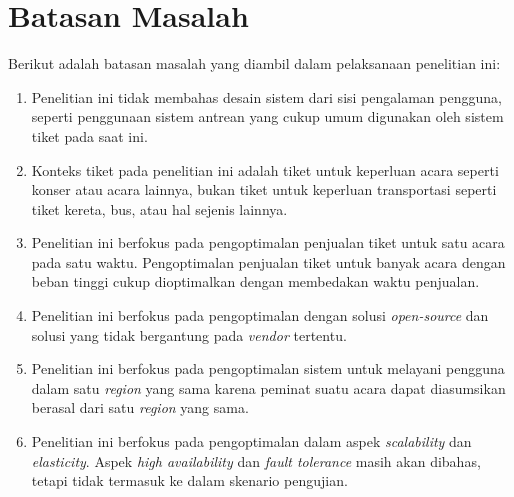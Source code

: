 \section{Batasan Masalah}
\label{sec:batasan-masalah}

Berikut adalah batasan masalah yang diambil dalam pelaksanaan penelitian ini:

\begin{enumerate}
  \item Penelitian ini tidak membahas desain sistem dari sisi pengalaman pengguna, seperti penggunaan sistem antrean yang cukup umum digunakan oleh sistem tiket pada saat ini.
  \item Konteks tiket pada penelitian ini adalah tiket untuk keperluan acara seperti konser atau acara lainnya, bukan tiket untuk keperluan transportasi seperti tiket kereta, bus, atau hal sejenis lainnya.
  \item Penelitian ini berfokus pada pengoptimalan penjualan tiket untuk satu acara pada satu waktu. Pengoptimalan penjualan tiket untuk banyak acara dengan beban tinggi cukup dioptimalkan dengan membedakan waktu penjualan.
  \item Penelitian ini berfokus pada pengoptimalan dengan solusi \textit{open-source} dan solusi yang tidak bergantung pada \textit{vendor} tertentu.
  \item Penelitian ini berfokus pada pengoptimalan sistem untuk melayani pengguna dalam satu \textit{region} yang sama karena peminat suatu acara dapat diasumsikan berasal dari satu \textit{region} yang sama.
  \item Penelitian ini berfokus pada pengoptimalan dalam aspek \textit{scalability} dan \textit{elasticity}. Aspek \textit{high availability} dan \textit{fault tolerance} masih akan dibahas, tetapi tidak termasuk ke dalam skenario pengujian.
\end{enumerate}


